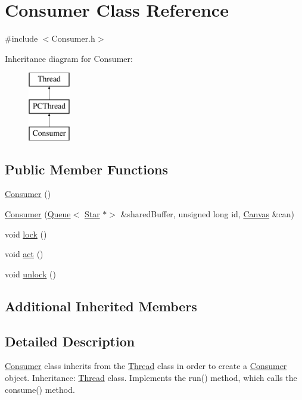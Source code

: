 \hypertarget{class_consumer}{}\section{Consumer Class Reference}
\label{class_consumer}


{\ttfamily \#include $<$Consumer.\+h$>$}

Inheritance diagram for Consumer\+:\begin{figure}[H]
\begin{center}
\leavevmode
\includegraphics[height=3.000000cm]{class_consumer}
\end{center}
\end{figure}
\subsection*{Public Member Functions}
\begin{DoxyCompactItemize}
\item 
\hyperlink{class_consumer_a31a7b4bc675d04c877269a5da93b981a}{Consumer} ()
\item 
\hyperlink{class_consumer_a8297e8de091856b95132502fa4a4ab44}{Consumer} (\hyperlink{class_queue}{Queue}$<$ \hyperlink{classtsgl_1_1_star}{Star} $\ast$$>$ \&shared\+Buffer, unsigned long id, \hyperlink{classtsgl_1_1_canvas}{Canvas} \&can)
\item 
void \hyperlink{class_consumer_a58ab6de26dfe34d59c0522fff19f1abf}{lock} ()
\item 
void \hyperlink{class_consumer_a759bbf618e780c1cca3f7a5136d3c910}{act} ()
\item 
void \hyperlink{class_consumer_acf783a2789b071a237f7759ccf6bacaf}{unlock} ()
\end{DoxyCompactItemize}
\subsection*{Additional Inherited Members}


\subsection{Detailed Description}
\hyperlink{class_consumer}{Consumer} class inherits from the \hyperlink{class_thread}{Thread} class in order to create a \hyperlink{class_consumer}{Consumer} object. Inheritance\+: \hyperlink{class_thread}{Thread} class. Implements the run() method, which calls the consume() method. 

